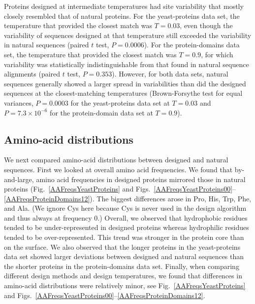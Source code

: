 \documentclass[12pt]{article}
\begin{document}
Proteins designed at intermediate temperatures had site variability that mostly closely resembled that of natural proteins. For the yeast-proteins data set, the temperature that provided the closest match was $T=0.03$, even though the variability of sequences designed at that temperature still exceeded the variability in natural sequences (paired $t$ test, $P= 0.0006$). For the protein-domains data set, the temperature that provided the closest match was $T=0.9$, for which variability was statistically indistinguishable from that found in natural sequence alignments (paired $t$ test, $P= 0.353$). However, for both data sets, natural sequences generally showed a larger spread in variabilities than did the designed sequences at the closest-matching temperatures (Brown-Forsythe test for equal variances, $P= 0.0003$ for the yeast-proteins data set at $T = 0.03$  and $P= 7.3\times 10^{-6}$ for the protein-domain data set at $T = 0.9$).

\subsection{Amino-acid distributions}
\label{AminoAcidDistributions}

We next compared amino-acid distributions between designed and natural sequences. First we looked at overall amino acid frequencies. We found that by-and-large, amino acid frequencies in designed proteins mirrored those in natural proteins (Fig.~\ref{AAFreqsYeastProteins} and Figs.~\ref{AAFreqsYeastProteins00}--\ref{AAFreqsProteinDomains12}). The biggest differences arose in Pro, His, Trp, Phe, and Ala. (We ignore Cys here because Cys is never used in the design algorithm and thus always at frequency 0.) Overall, we observed that hydrophobic residues tended to be under-represented in designed proteins whereas hydrophilic residues tended to be over-represented. This trend was stronger in the protein core than on the surface. We also observed that the longer proteins in the yeast-proteins data set showed larger deviations between designed and natural sequences than the shorter proteins in the protein-domains data set. Finally, when comparing different design methods and design temperatures, we found that differences in amino-acid distributions were relatively minor, see Fig.~\ref{AAFreqsYeastProteins} and Figs.~\ref{AAFreqsYeastProteins00}--\ref{AAFreqsProteinDomains12}.
\end{document}
